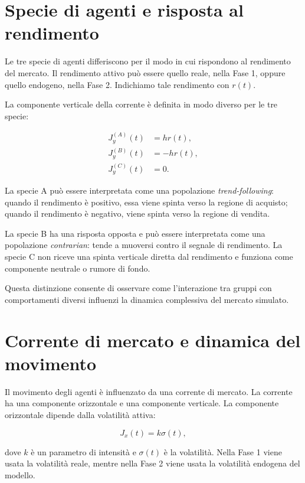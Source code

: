 \section{Specie di agenti e risposta al rendimento}

Le tre specie di agenti differiscono per il modo in cui rispondono al rendimento
del mercato. Il rendimento attivo può essere quello reale, nella Fase 1, oppure
quello endogeno, nella Fase 2. Indichiamo tale rendimento con \(r(t)\).

La componente verticale della corrente è definita in modo diverso per le tre
specie:

\begin{align}
    J_y^{(A)}(t) &= h r(t), \\
    J_y^{(B)}(t) &= -h r(t), \\
    J_y^{(C)}(t) &= 0.
\end{align}

La specie A può essere interpretata come una popolazione \textit{trend-following}:
quando il rendimento è positivo, essa viene spinta verso la regione di acquisto;
quando il rendimento è negativo, viene spinta verso la regione di vendita.

La specie B ha una risposta opposta e può essere interpretata come una popolazione
\textit{contrarian}: tende a muoversi contro il segnale di rendimento. La specie C
non riceve una spinta verticale diretta dal rendimento e funziona come componente
neutrale o rumore di fondo.

Questa distinzione consente di osservare come l'interazione tra gruppi con
comportamenti diversi influenzi la dinamica complessiva del mercato simulato.

\section{Corrente di mercato e dinamica del movimento}

Il movimento degli agenti è influenzato da una corrente di mercato. La corrente
ha una componente orizzontale e una componente verticale. La componente
orizzontale dipende dalla volatilità attiva:

\begin{equation}
    J_x(t) = k \sigma(t),
\end{equation}

dove \(k\) è un parametro di intensità e \(\sigma(t)\) è la volatilità. Nella
Fase 1 viene usata la volatilità reale, mentre nella Fase 2 viene usata la
volatilità endogena del modello.

